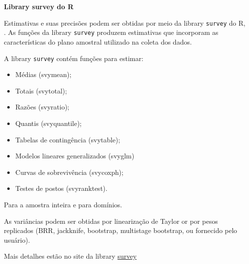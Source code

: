 \documentclass[]{book}
\providecommand{\tightlist}{%
  \setlength{\itemsep}{0pt}\setlength{\parskip}{0pt}}
\numberwithin{example}{chapter}
\numberwithin{remark}{chapter}
\numberwithin{definition}{chapter}
\begin{document}
\textbf{Library survey do R}

Estimativas e suas precisões podem ser obtidas por meio da library
\texttt{survey} do R, \citep{R-survey}. As funções da library
\texttt{survey} produzem estimativas que incorporam as características
do plano amostral utilizado na coleta dos dados.

A library \texttt{survey} contém funções para estimar:

\begin{itemize}
\tightlist
\item
  Médias (svymean);
\item
  Totais (svytotal);
\item
  Razões (svyratio);
\item
  Quantis (svyquantile);
\item
  Tabelas de contingência (svytable);
\item
  Modelos lineares generalizados (svyglm)
\item
  Curvas de sobrevivência (svycoxph);
\item
  Testes de postos (svyranktest).
\end{itemize}

Para a amostra inteira e para domínios.

As variâncias podem ser obtidas por linearização de Taylor or por pesos
replicados (BRR, jackknife, bootstrap, multistage bootstrap, ou
fornecido pelo usuário).

Mais detalhes estão no site da library
\href{http://r-survey.r-forge.r-project.org/survey/}{survey}


\end{document}
